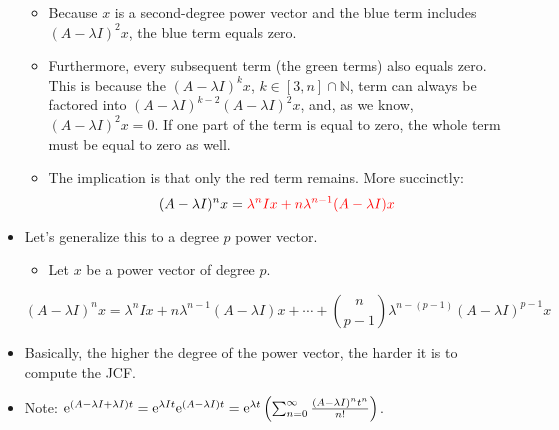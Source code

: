 \documentclass{article}
\begin{document}
\begin{itemize}
\begin{itemize}
\begin{equation*}
        \end{equation*}
        \item Because $x$ is a second-degree power vector and the blue term includes $(A-\lambda I)^2x$, the blue term equals zero.
        \item Furthermore, every subsequent term (the green terms) also equals zero. This is because the $(A-\lambda I)^kx$, $k\in[3,n]\cap\mathbb{N}$, term can always be factored into $(A-\lambda I)^{k-2}(A-\lambda I)^2x$, and, as we know, $(A-\lambda I)^2x=0$. If one part of the term is equal to zero, the whole term must be equal to zero as well.
        \item The implication is that only the red term remains. More succinctly:
        \begin{equation*}
            (A-\lambda I)^nx = {\color{red}\lambda^nIx+n\lambda^{n-1}(A-\lambda I)x}
        \end{equation*}
    \end{itemize}
    \item Let's generalize this to a degree $p$ power vector.
    \begin{itemize}
        \item Let $x$ be a power vector of degree $p$.
    \end{itemize}
    \begin{equation*}
        (A-\lambda I)^nx = \lambda^nIx+n\lambda^{n-1}(A-\lambda I)x+\cdots+\binom{n}{p-1}\lambda^{n-(p-1)}(A-\lambda I)^{p-1}x
    \end{equation*}
    \item Basically, the higher the degree of the power vector, the harder it is to compute the JCF.
    \item Note: $\text{e}^{(A-\lambda I+\lambda I)t} = \text{e}^{\lambda It}\text{e}^{(A-\lambda I)t} = \text{e}^{\lambda t}\left( \sum_{n=0}^\infty\frac{(A-\lambda I)^nt^n}{n!} \right)$.
\end{itemize}
\end{document}
